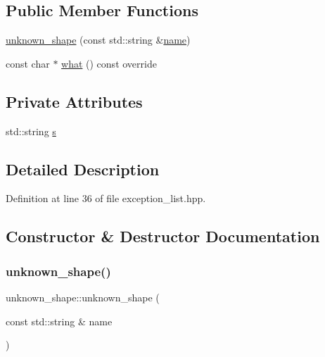 \subsection*{Public Member Functions}
\begin{DoxyCompactItemize}
\item 
\hyperlink{classunknown__shape_acba61daef65acb20740ee969373afa2d}{unknown\+\_\+shape} (const std\+::string \&\hyperlink{button__actions_8hpp_a9b45b3e13bd9167aab02e17e08916231}{name})
\item 
const char $\ast$ \hyperlink{classunknown__shape_a79e591bd483fc895aeeffccffe56ea14}{what} () const override
\end{DoxyCompactItemize}
\subsection*{Private Attributes}
\begin{DoxyCompactItemize}
\item 
std\+::string \hyperlink{classunknown__shape_a315cb57042a51070978ee5fbb8150a81}{s}
\end{DoxyCompactItemize}


\subsection{Detailed Description}


Definition at line 36 of file exception\+\_\+list.\+hpp.



\subsection{Constructor \& Destructor Documentation}
\mbox{\label{classunknown__shape_acba61daef65acb20740ee969373afa2d}} 
\subsubsection{\texorpdfstring{unknown\+\_\+shape()}{unknown\_shape()}}
{\footnotesize\ttfamily unknown\+\_\+shape\+::unknown\+\_\+shape (\begin{DoxyParamCaption}\item[{const std\+::string \&}]{name }\end{DoxyParamCaption})\hspace{0.3cm}{\ttfamily [inline]}}



